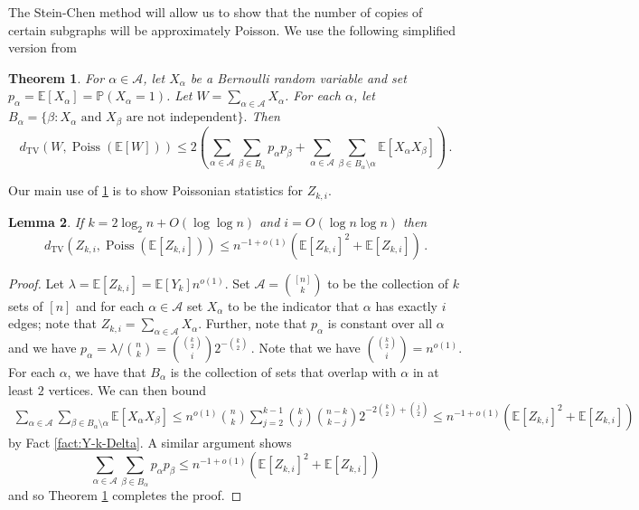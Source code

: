 \documentclass[11pt]{article}
\newtheorem{theorem}{Theorem}
\newtheorem{lemma}[theorem]{Lemma}
\theoremstyle{definition}
\theoremstyle{remark}
\newcommand{\Poiss}{\operatorname{Poiss}}
\newcommand{\TV}{\mathrm{TV}}
\newcommand{\E}{\mathbb{E}}
\newcommand{\PP}{\mathbb{P}}
\newcommand{\cA}{\mathcal{A}}
\begin{document}
The Stein-Chen method will allow us to show that the number of copies of certain subgraphs will be approximately Poisson.  We use the following simplified version from \cite[Thm.\ 1]{arratia1990poisson}

\begin{theorem} \label{thm:stein-chen}
   For $\alpha \in \cA$, let $X_\alpha$ be  a Bernoulli random variable and set  $p_\alpha = \E [X_\alpha] = \PP(X_\alpha = 1)$.
     Let $W = \sum_{\alpha \in \cA} X_\alpha$. For each $\alpha$, let $B_\alpha = \{\beta : X_\alpha \text{ and } X_\beta \text{ are not independent}\}.$   Then 
     $$d_{\TV}(W, \Poiss(\E [W]))  \leq 2\left(\sum_{\alpha \in \cA} \sum_{\beta \in B_\alpha}p_\alpha p_\beta + \sum_{\alpha \in \cA} \sum_{\beta \in B_\alpha \setminus \alpha} \E[X_\alpha X_\beta] \right)\,.$$
\end{theorem}


Our main use of \cref{thm:stein-chen} is to show Poissonian statistics for $Z_{k,i}$.

\begin{lemma}\label{lem:Poisson-approx-Z}
    If $k = 2\log_2 n + O(\log \log n)$ and $i = O\left(\log n \log n\right)$ then $$d_{\TV}(Z_{k,i},\Poiss(\E [Z_{k,i}])) \leq n^{-1 + o(1)} ( \E [Z_{k,i}]^2 + \E [Z_{k,i}])\,. $$
\end{lemma}
\begin{proof}
    Let $\lambda = \E[Z_{k,i}] = \E[Y_k] n^{o(1)}$.  Set $\cA = \binom{[n]}{k}$ to be the collection of $k$ sets of $[n]$ and for each $\alpha \in \cA$ set $X_\alpha$ to be the indicator that $\alpha$ has exactly $i$ edges; note that $Z_{k,i} = \sum_{\alpha \in \cA} X_\alpha$.  Further, note that $p_\alpha$ is constant over all $\alpha$ and we have $p_\alpha  = \lambda / \binom{n}{k} = \binom{\binom{k}{2}}{i} 2^{-\binom{k}{2}}\,.$   Note that we have    $\binom{\binom{k}{2}}{i} = n^{o(1)}$.
    For each $\alpha$, we have that $B_\alpha$ is the collection of sets that overlap with $\alpha$ in at least $2$ vertices.  We can then bound \begin{align*}
        \sum_{\alpha \in \cA} \sum_{\beta \in B_\alpha \setminus \alpha} \E[X_\alpha X_\beta] \leq  n^{o(1)} \binom{n}{k} \sum_{j = 2}^{k-1} \binom{k}{j} \binom{n-k}{k-j} 2^{-2\binom{k}{2} + \binom{j}{2}} \leq n^{-1 + o(1)} ( \E [Z_{k,i}]^2 + \E [Z_{k,i}])
    \end{align*}
    by Fact \ref{fact:Y-k-Delta}.  A similar argument shows $$\sum_{\alpha \in \cA} \sum_{\beta \in B_\alpha}p_\alpha p_\beta  \leq n^{-1 + o(1)} ( \E [Z_{k,i}]^2 + \E [Z_{k,i}])$$ and so Theorem \ref{thm:stein-chen} completes the proof.
\end{proof}
\end{document}
